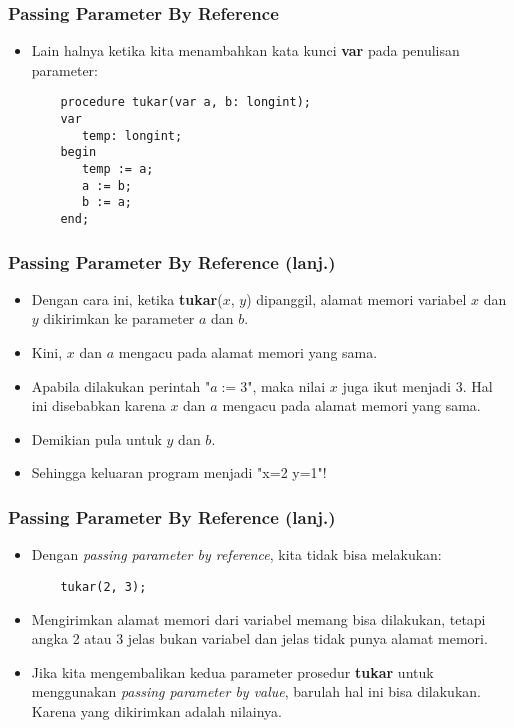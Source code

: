 \documentclass{beamer}
\begin{document}
\begin{frame}[fragile]
\frametitle{Passing Parameter By Reference}
\begin{itemize}
	\item Lain halnya ketika kita menambahkan kata kunci \textbf{var} pada penulisan parameter:
	\begin{lstlisting}
	procedure tukar(var a, b: longint);
	var
	   temp: longint;
	begin
	   temp := a;
	   a := b;
	   b := a;
	end;
	\end{lstlisting}
\end{itemize}
\end{frame}

\begin{frame}[fragile]
\frametitle{Passing Parameter By Reference (lanj.)}
\begin{itemize}
	\item Dengan cara ini, ketika \textbf{tukar}($x$, $y$) dipanggil, \alert{alamat memori variabel} $x$ dan $y$ dikirimkan ke parameter $a$ dan $b$.
	\item Kini, $x$ dan $a$ mengacu pada alamat memori yang sama. 
	\item Apabila dilakukan perintah "$a := 3$", maka nilai $x$ juga ikut menjadi 3. Hal ini disebabkan karena $x$ dan $a$ mengacu pada \alert{alamat memori yang sama}.
	\item Demikian pula untuk $y$ dan $b$.
	\item Sehingga keluaran program menjadi "x=2 y=1"!
\end{itemize}
\end{frame}

\begin{frame}[fragile]
\frametitle{Passing Parameter By Reference (lanj.)}
\begin{itemize}
	\item Dengan \textit{passing parameter by reference}, kita tidak bisa melakukan:
	\begin{lstlisting}
	tukar(2, 3); 
	\end{lstlisting}
	
	\item Mengirimkan alamat memori dari variabel memang bisa dilakukan, tetapi angka 2 atau 3 jelas bukan variabel dan jelas \alert{tidak punya alamat memori}.
	\item Jika kita mengembalikan kedua parameter prosedur \textbf{tukar} untuk menggunakan \textit{passing parameter by value}, barulah hal ini bisa dilakukan. Karena yang dikirimkan adalah \alert{nilainya}.
\end{itemize}
\end{frame}
\end{document}
